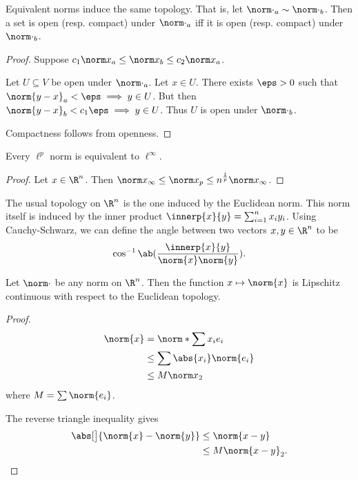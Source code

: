 \begin{proposition}
    Equivalent norms induce the same topology.
    That is, let ${\norm\cdot}_a \sim {\norm\cdot}_b$.
    Then a set is open (resp. compact) under ${\norm\cdot}_a$ iff it is
    open (resp. compact) under ${\norm\cdot}_b$.
\end{proposition}
\begin{proof}
    Suppose $c_1 {\norm x}_a \le {\norm x}_b \le c_2 {\norm x}_a$.

    Let $U \subseteq V$ be open under ${\norm\cdot}_a$.
    Let $x \in U$.
    There exists $\eps > 0$ such that
    ${\norm{y - x}}_a < \eps \implies y \in U$.
    But then ${\norm{y - x}}_b < c_1 \eps \implies y \in U$.
    Thus $U$ is open under ${\norm\cdot}_b$.

    Compactness follows from openness.
\end{proof}

\begin{proposition}
    Every $\ell^p$ norm is equivalent to $\ell^\infty$.
\end{proposition}
\begin{proof}
    Let $x \in \R^n$.
    Then ${\norm x}_\infty \le {\norm x}_p \le n^{\frac1p} {\norm x}_\infty$.
\end{proof}

The usual topology on $\R^n$ is the one induced by the Euclidean norm.
This norm itself is induced by the inner product
$\innerp{x}{y} = \sum_{i=1}^n x_i y_i$. %
Using Cauchy-Schwarz, we can define the angle between two vectors
$x, y \in \R^n$ to be \[
    \cos^{-1} \ab(\frac{\innerp{x}{y}}{\norm{x} \norm{y}}).
\]

\begin{proposition*} \label{thm:norm:cont}
    Let $\norm\cdot$ be any norm on $\R^n$.
    Then the function $x \mapsto \norm{x}$ is Lipschitz continuous
    with respect to the Euclidean topology.
\end{proposition*}
\begin{proof}
    \begin{align*}
        \norm{x} &= \norm*{\sum x_i e_i} \\
            &\le \sum \abs{x_i} \norm{e_i} \\
            &\le M {\norm x}_2
    \end{align*} where $M = \sum \norm{e_i}$.

    The reverse triangle inequality gives
    \begin{align*}
        \abs[\big]{\norm{x} - \norm{y}} &\le \norm{x - y} \\
            &\le M {\norm{x - y}}_2. \qedhere
    \end{align*}
\end{proof}

